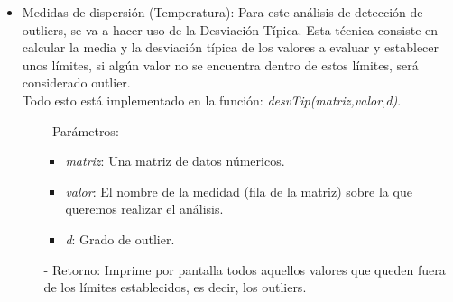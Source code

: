 \documentclass[a4paper, 12pt]{article}
\begin{document}
{\begin{itemize}
\begin{itemize}
                    \item[-] Retorno: Imprime por pantalla todos aquellos valores que queden fuera de los límites establecidos, es decir, los outliers.

                    \item[-] Explicación: Esta función calcula los outliers sobre una serie de valores. Recibe el grado de outlier (\emph{d}) y una matriz (\emph{matriz}) con dichos valores y lo primero que hace es crear un dataframe de la traspuesta de dicha matriz, para facilitar su tratamiento. Después a partir de \emph{valor}, obtiene la fila de la matriz que contiene los valores que vamos a evaluar. Una vez hecho esto hace uso de la función \emph{quantiler()}, la cual hemos implementado previamente, para calcular el primer y tercer cuartil, \emph{$Q_{1}$} y \emph{$Q_{3}$} respectivamente . Por último calcula los límites a partir de, \emph{$(Q_{1} - d \cdot (Q_{3} - Q_{1}), Q_{3} + d \cdot (Q_{3} - Q_{1}))$} e imprimirá por pantalla todos aquellos valores que se encuentren fuera de estos límites establecidos, ya que, serán considerados outliers.
                \end{itemize}

                \item Medidas de dispersión (Temperatura): Para este análisis de detección de outliers, se va a hacer uso de la Desviación Típica. Esta técnica consiste en calcular la media y la desviación típica de los valores a evaluar y establecer unos límites, si algún valor no se encuentra dentro de estos límites, será considerado outlier. \\
                Todo esto está implementado en la función: \emph{desvTip(matriz,valor,d)}.
                \begin{itemize}
                    \item[-] Parámetros:
                    \begin{itemize}
                        \item \emph{matriz}: Una matriz de datos númericos.
                        \item \emph{valor}: El nombre de la medidad (fila de la matriz) sobre la que queremos realizar el análisis.
                        \item \emph{d}: Grado de outlier.
                    \end{itemize}
                    
                    \item[-] Retorno: Imprime por pantalla todos aquellos valores que queden fuera de los límites establecidos, es decir, los outliers.
                    

\end{itemize}
\end{itemize}}
\end{document}
